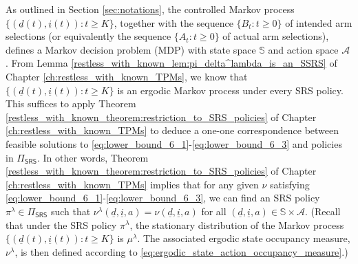 As outlined in Section \ref{sec:notations}, the controlled Markov process $\{(\underline{d}(t),\underline{i}(t)):t\geq K\}$, together with the sequence $\{B_t:t\geq 0\}$ of intended arm selections (or equivalently the sequence $\{A_t:t\geq 0\}$ of actual arm selections), defines a Markov decision problem (MDP) with state space $\mathbb{S}$ and action space $\mathcal{A}$. From Lemma \ref{restless_with_known_lem:pi_delta^lambda_is_an_SSRS} of Chapter \ref{ch:restless_with_known_TPMs}, we know that $\{(\underline{d}(t), \underline{i}(t)): t\geq K\}$ is an ergodic Markov process under every SRS policy. This suffices to apply Theorem \ref{restless_with_known_theorem:restriction_to_SRS_policies} of Chapter \ref{ch:restless_with_known_TPMs} to deduce a one-one correspondence between feasible solutions to \eqref{eq:lower_bound_6_1}-\eqref{eq:lower_bound_6_3} and policies in $\Pi_{\textsf{SRS}}$. In other words, Theorem \ref{restless_with_known_theorem:restriction_to_SRS_policies} of Chapter \ref{ch:restless_with_known_TPMs} implies that for any given $\nu$ satisfying \eqref{eq:lower_bound_6_1}-\eqref{eq:lower_bound_6_3}, we can find an SRS policy $\pi^\lambda\in\Pi_{\textsf{SRS}}$ such that $\nu^\lambda(\underline{d},\underline{i},a)=\nu(\underline{d},\underline{i},a)$ for all $(\underline{d},\underline{i},a)\in\mathbb{S}\times\mathcal{A}$. (Recall that under the SRS policy $\pi^\lambda$, the stationary distribution of the Markov process $\{(\underline{d}(t),\underline{i}(t)):t\geq K\}$ is $\mu^\lambda$. The associated ergodic state occupancy measure, $\nu^\lambda$, is then defined according to \eqref{eq:ergodic_state_action_occupancy_measure}.)

